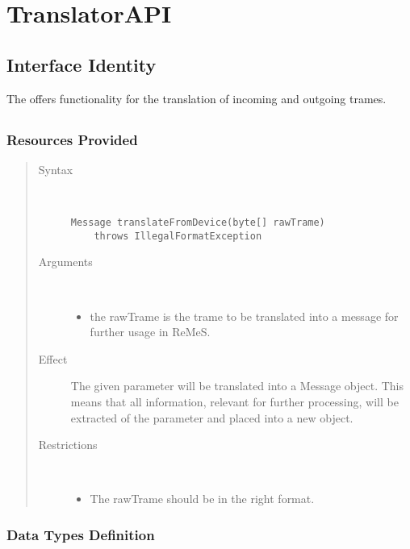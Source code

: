 \section{TranslatorAPI}
\label{api:rm-translator-api}

\subsection{Interface Identity}

\npar The  offers functionality for the translation of
incoming and outgoing trames.

\subsection{}

\subsubsection{Resources Provided}

\begin{quote}
	\begin{description}
		\item[Syntax] \
		\begin{verbatim}
Message translateFromDevice(byte[] rawTrame) 
    throws IllegalFormatException
		\end{verbatim}
		\item[Arguments] \
		\begin{itemize}
		  \item the rawTrame is the trame to be translated into a message for further
		  usage in ReMeS.
		\end{itemize}
		\item[Effect] The given parameter will be translated into a Message object.
		This means that all information, relevant for further processing, will be
		extracted of the parameter and placed into a new object.
		\item[Restrictions] \
		\begin{itemize}
		  \item The rawTrame should be in the right format.
		\end{itemize}
	\end{description} 
\end{quote}

\subsubsection{Data Types Definition}

